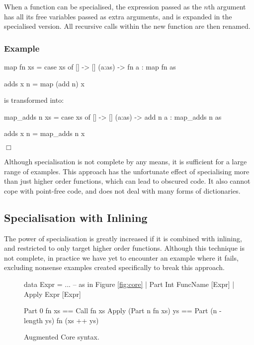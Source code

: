 \documentclass[preprint]{sigplanconf}
\newcounter{exmp}
\newcommand{\yesexample}{\subsubsection*{Example \arabic{exmp}}\addtocounter{exmp}{1}}
\newcommand{\noexample}{\hfill$\Box$}
\newenvironment{example}{\yesexample}{\noexample}
\begin{document}
When a function can be specialised, the expression passed as the $n$th argument has all its free variables passed as extra arguments, and is expanded in the specialised version. All recursive calls within the new function are then renamed.

\begin{example}
\begin{code}
map fn xs = case  xs of
                  []      -> []
                  (a:as)  -> fn a : map fn as

adds x n = map (add n) x
\end{code}

\noindent is transformed into:

\begin{code}
map_adds n xs = case  xs of
                      []      -> []
                      (a:as)  -> add n a : map_adds n as

adds x n = map_adds n x
\end{code}
\end{example}

Although specialisation is not complete by any means, it is sufficient for a large range of examples. This approach has the unfortunate effect of specialising more than just higher order functions, which can lead to obscured code. It also cannot cope with point-free code, and does not deal with many forms of dictionaries.

\subsection{Specialisation with Inlining}

The power of specialisation is greatly increased if it is combined with inlining, and restricted to only target higher order functions. Although this technique is not complete, in practice we have yet to encounter an example where it fails, excluding nonsense examples created specifically to break this approach.

\begin{figure}
\begin{code}
data Expr  =  ... -- as in Figure {\ref{fig:core}}
           |  Part   Int FuncName [Expr]
           |  Apply  Expr [Expr]

Part 0 fn xs == Call fn xs
Apply (Part n fn xs) ys == Part (n - length ys) fn (xs ++ ys)
\end{code}
\caption{Augmented Core syntax.}
\label{fig:core_ho}
\end{figure}
\end{document}
